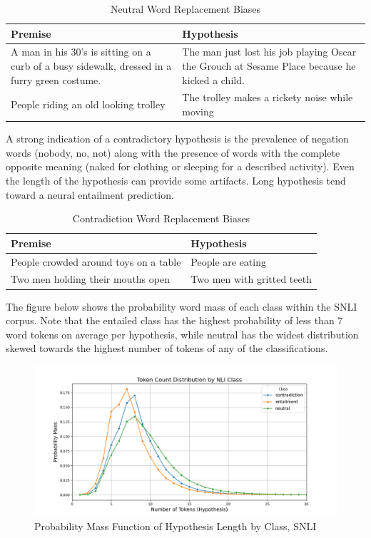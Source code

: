 \documentclass[11pt]{article}
\begin{document}
\begin{table}[h!]
    \centering
    \begin{tabularx}{0.45\textwidth} { 
  | >{\raggedright\arraybackslash}X 
  | >{\raggedright\arraybackslash}X | }
    \hline
    Premise & Hypothesis \\
    \hline\hline
        A man in his 30's is sitting on a curb of a busy sidewalk, dressed in a furry green costume. & The man just lost his job playing Oscar the Grouch at Sesame Place because he kicked a child. \\
        \hline
       People riding an old looking trolley & The trolley makes a rickety noise while moving \\
        \hline
    \end{tabularx}
    \caption{Neutral Word Replacement Biases}
    \label{tab:NWRB}
\end{table}
A strong indication of a contradictory hypothesis is the prevalence of negation words (nobody, no, not) along with the presence of words with the complete opposite meaning (naked for clothing or sleeping for a described activity). Even the length of the hypothesis can provide some artifacts. Long hypothesis tend toward a neural entailment prediction.  \citealp{princeton}

\begin{table}[h!]
    \centering
    \begin{tabularx}{0.45\textwidth} { 
  | >{\raggedright\arraybackslash}X 
  | >{\raggedright\arraybackslash}X | }
    \hline
    Premise & Hypothesis \\
    \hline\hline
        People crowded around toys on a table & People are eating \\
        \hline
       Two men holding their mouths open & Two men with gritted teeth \\
        \hline
    \end{tabularx}
    \caption{Contradiction Word Replacement Biases}
    \label{tab:CWRB}
\end{table}
The figure below shows the probability word mass of each class within the SNLI corpus. Note that the entailed class has the highest probability of less than 7 word tokens on average per hypothesis, while neutral has the widest distribution skewed towards the highest number of tokens of any of the classifications.
\begin{figure}[h!]
    \centering
    \includegraphics[width=1.0\linewidth]{Figure_tokenvsprobmass.png}
    \caption{Probability Mass Function of Hypothesis Length by Class, SNLI}
    \label{fig:}
\end{figure}
\end{document}
